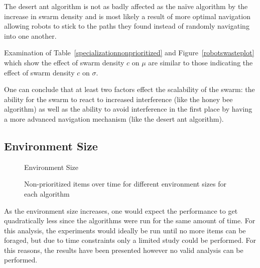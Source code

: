 The desert ant algorithm is not as badly affected as the na\"ive algorithm by the increase in swarm density and is most likely a result of more optimal navigation allowing robots to stick to the paths they found instead of randomly navigating into one another. 

Examination of Table~\ref{specializationnonprioritized} and Figure~\ref{robotswasteplot} which show the effect of swarm density $c$ on $\mu$ are similar to those indicating the effect of swarm density $c$ on $\sigma$.

One can conclude that at least two factors effect the scalability of the swarm: the ability for the swarm to react to increased interference (like the honey bee algorithm) as well as the ability to avoid interference in the first place by having a more advanced navigation mechanism (like the desert ant algorithm).

\subsection{Environment Size}
\label{results:environmentsize}




\begin{figure}[!htb]
\centering
\resizebox{\textwidth}{!}{}
\caption{Environment Size}
\label{sizegoldplot}
\end{figure}

\begin{figure}[!htb]
\centering
\resizebox{\textwidth}{!}{}
\caption{Non-prioritized items over time for different environment sizes for each algorithm}
\label{sizewasteplot}
\end{figure}

As the environment size increases, one would expect the performance to get quadratically less since the algorithms were run for the same amount of time. For this analysis, the experiments would ideally be run until no more items can be foraged, but due to time constraints only a limited study could be performed. For this reasons, the results have been presented however no valid analysis can be performed.

